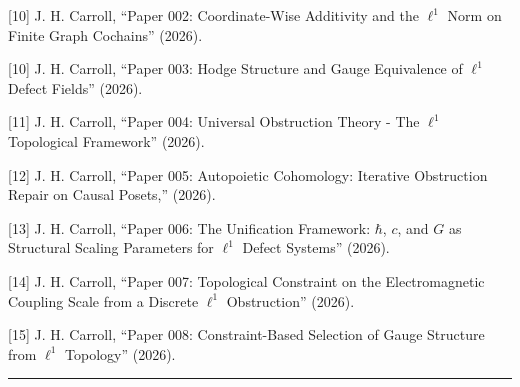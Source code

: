 \documentclass[
]{article}
\begin{document}
{[}10{]} J. H. Carroll, ``Paper 002: Coordinate-Wise Additivity and the
\(\ell^1\) Norm on Finite Graph Cochains'' (2026).

{[}10{]} J. H. Carroll, ``Paper 003: Hodge Structure and Gauge
Equivalence of \(\ell^1\) Defect Fields'' (2026).

{[}11{]} J. H. Carroll, ``Paper 004: Universal Obstruction Theory - The
\(\ell^1\) Topological Framework'' (2026).

{[}12{]} J. H. Carroll, ``Paper 005: Autopoietic Cohomology: Iterative
Obstruction Repair on Causal Posets,'' (2026).

{[}13{]} J. H. Carroll, ``Paper 006: The Unification Framework:
\(\hbar\), \(c\), and \(G\) as Structural Scaling Parameters for
\(\ell^1\) Defect Systems'' (2026).

{[}14{]} J. H. Carroll, ``Paper 007: Topological Constraint on the
Electromagnetic Coupling Scale from a Discrete \(\ell^1\) Obstruction''
(2026).

{[}15{]} J. H. Carroll, ``Paper 008: Constraint-Based Selection of Gauge
Structure from \(\ell^1\) Topology'' (2026).

\begin{center}\rule{0.5\linewidth}{0.5pt}\end{center}
\end{document}

